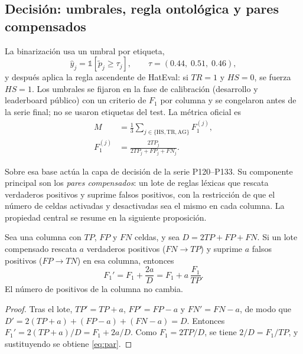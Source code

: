 \subsection{Decisión: umbrales, regla ontológica y pares compensados}

La binarización usa un umbral por etiqueta,
\begin{equation}
\hat y_j = \mathbb{1}\left[\tilde p_j \ge \tau_j\right], \qquad
\tau = (0.44,\;0.51,\;0.46),
\label{eq:umbral}
\end{equation}
y después aplica la regla ascendente de HatEval: si $TR=1$ y $HS=0$, se
fuerza $HS=1$. Los umbrales se fijaron en la fase de calibración (desarrollo y
leaderboard público) con un criterio de $F_1$ por columna
\cite{lipton2014thresholding,nan2012optimizing} y se congelaron antes de la
serie final; no se usaron etiquetas del test. La métrica oficial es
\begin{equation}
\begin{split}
M &= \frac{1}{3}\sum_{j\in\{\mathrm{HS},\mathrm{TR},\mathrm{AG}\}} F_1^{(j)},\\
F_1^{(j)} &= \frac{2TP_j}{2TP_j+FP_j+FN_j}.
\end{split}
\label{eq:f1}
\end{equation}

Sobre esa base actúa la capa de decisión de la serie P120--P133. Su
componente principal son los \emph{pares compensados}: un lote de reglas
léxicas que rescata verdaderos positivos y suprime falsos positivos, con la
restricción de que el número de celdas activadas y desactivadas sea el mismo
en cada columna. La propiedad central se resume en la siguiente proposición.

\begin{proposicion}
\label{prop:par}
Sea una columna con $TP$, $FP$ y $FN$ celdas, y sea $D=2TP+FP+FN$. Si un
lote compensado rescata $a$ verdaderos positivos ($FN\to TP$) y suprime $a$
falsos positivos ($FP\to TN$) en esa columna, entonces
\begin{equation}
F_1' = F_1 + \frac{2a}{D} = F_1 + a\,\frac{F_1}{TP}.
\label{eq:par}
\end{equation}
El número de positivos de la columna no cambia.
\end{proposicion}

\begin{proof}
Tras el lote, $TP'=TP+a$, $FP'=FP-a$ y $FN'=FN-a$, de modo que
$D'=2(TP+a)+(FP-a)+(FN-a)=D$. Entonces
$F_1'=2(TP+a)/D=F_1+2a/D$. Como $F_1=2TP/D$, se tiene $2/D=F_1/TP$, y
sustituyendo se obtiene \eqref{eq:par}.
\end{proof}

